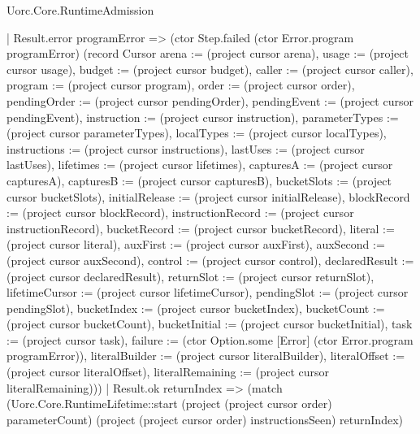 \begin{lexlean}{Uorc.Core.RuntimeAdmission}
\begin{semanticmodule}
{              | Result.error programError => (ctor Step.failed (ctor Error.program programError) (record Cursor {arena := (project cursor arena), usage := (project cursor usage), budget := (project cursor budget), caller := (project cursor caller), program := (project cursor program), order := (project cursor order), pendingOrder := (project cursor pendingOrder), pendingEvent := (project cursor pendingEvent), instruction := (project cursor instruction), parameterTypes := (project cursor parameterTypes), localTypes := (project cursor localTypes), instructions := (project cursor instructions), lastUses := (project cursor lastUses), lifetimes := (project cursor lifetimes), capturesA := (project cursor capturesA), capturesB := (project cursor capturesB), bucketSlots := (project cursor bucketSlots), initialRelease := (project cursor initialRelease), blockRecord := (project cursor blockRecord), instructionRecord := (project cursor instructionRecord), bucketRecord := (project cursor bucketRecord), literal := (project cursor literal), auxFirst := (project cursor auxFirst), auxSecond := (project cursor auxSecond), control := (project cursor control), declaredResult := (project cursor declaredResult), returnSlot := (project cursor returnSlot), lifetimeCursor := (project cursor lifetimeCursor), pendingSlot := (project cursor pendingSlot), bucketIndex := (project cursor bucketIndex), bucketCount := (project cursor bucketCount), bucketInitial := (project cursor bucketInitial), task := (project cursor task), failure := (ctor Option.some [Error] (ctor Error.program programError)), literalBuilder := (project cursor literalBuilder), literalOffset := (project cursor literalOffset), literalRemaining := (project cursor literalRemaining)}))
              | Result.ok returnIndex => (match (Uorc.Core.RuntimeLifetime::start (project (project cursor order) parameterCount) (project (project cursor order) instructionsSeen) returnIndex)
}
\end{semanticmodule}
\end{lexlean}
